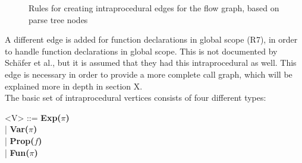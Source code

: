 \documentclass[journal,10pt]{IEEEtran} %
\begin{document}
\begin{figure}[H]
\hspace*{-.4cm}
\caption{Rules for creating intraprocedural edges for the flow graph, based on parse tree nodes}
\end{figure}

A different edge is added for function declarations in global scope (R7), in order to handle function declarations in global scope. This is not documented by Sch\"{a}fer et al., but it is assumed that they had this intraprocedural as well. This edge is necessary in order to provide a more complete call graph, which will be explained more in depth in section X. \\ %

The basic set of intraprocedural vertices consists of four different types:
\setlength{\grammarindent}{2cm}
\begin{grammar}
<V> ::= \textbf{Exp($\pi$)} \\
| \textbf{Var($\pi$)}  \\
| \textbf{Prop($f$)}  \\
| \textbf{Fun($\pi$)} 
\end{grammar}
\end{document}

